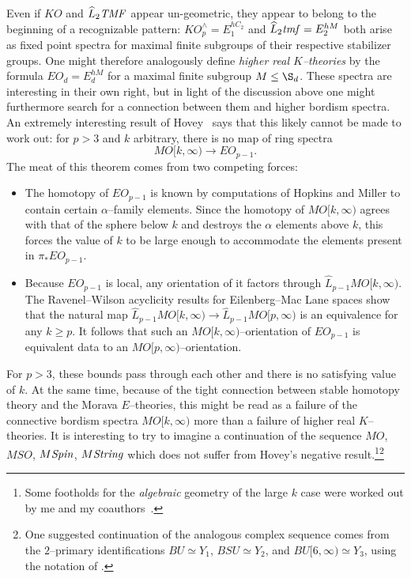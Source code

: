 Even if \(KO\) and \(\widehat L_2 \mathit{TMF}\) appear un-geometric, they appear to belong to the beginning of a recognizable pattern: \(KO^\wedge_p = E_1^{hC_2}\) and \(\widehat L_2 \mathit{tmf} = E_2^{hM}\) both arise as fixed point spectra for maximal finite subgroups of their respective stabilizer groups.  One might therefore analogously define \textit{higher real \(K\)--theories} by the formula \(EO_d = E_d^{hM}\) for a maximal finite subgroup \(M \le \S_d\).  These spectra are interesting in their own right, but in light of the discussion above one might furthermore search for a connection between them and higher bordism spectra.  An extremely interesting result of Hovey~\cite[Proposition 2.3.4]{HoveyVnEltsOfRings} says that this likely cannot be made to work out: for \(p > 3\) and \(k\) arbitrary, there is no map of ring spectra \[MO[k, \infty) \to EO_{p-1}.\]  The meat of this theorem comes from two competing forces:
\begin{itemize}
    \item The homotopy of \(EO_{p-1}\) is known by computations of Hopkins and Miller to contain certain \(\alpha\)--family elements.  Since the homotopy of \(MO[k, \infty)\) agrees with that of the sphere below \(k\) and destroys the \(\alpha\) elements above \(k\), this forces the value of \(k\) to be large enough to accommodate the elements present in \(\pi_* EO_{p-1}\).
    \item Because \(EO_{p-1}\) is local, any orientation of it factors through \(\widehat L_{p-1} MO[k, \infty)\).  The Ravenel--Wilson acyclicity results for Eilenberg--Mac Lane spaces show that the natural map \(\widehat L_{p-1} MO[k, \infty) \to \widehat L_{p-1} MO[p, \infty)\) is an equivalence for any \(k \ge p\).  It follows that such an \(MO[k, \infty)\)--orientation of \(EO_{p-1}\) is equivalent data to an \(MO[p, \infty)\)--orientation.
\end{itemize}
For \(p > 3\), these bounds pass through each other and there is no satisfying value of \(k\).  At the same time, because of the tight connection between stable homotopy theory and the Morava \(E\)--theories, this might be read as a failure of the connective bordism spectra \(MO[k, \infty)\) more than a failure of higher real \(K\)--theories.  It is interesting to try to imagine a continuation of the sequence \(MO\), \(MSO\), \(M\mathit{Spin}\), \(M\mathit{String}\) which does not suffer from Hovey's negative result.\footnote{Some footholds for the \emph{algebraic} geometry of the large \(k\) case were worked out by me and my coauthors~\cite{HLP}.}\footnote{One suggested continuation of the analogous complex sequence comes from the \(2\)--primary identifications \(BU \simeq Y_1\), \(BSU \simeq Y_2\), and \(BU[6, \infty) \simeq Y_3\), using the notation of .}








